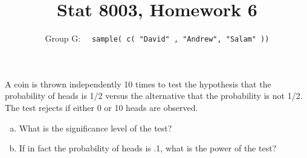 \documentclass[12pt]{article}
\newenvironment{question}[2][Question]{\begin{trivlist}
\item[\hskip \labelsep {\bfseries #1}\hskip \labelsep {\bfseries #2.}]}{\end{trivlist}}
\begin{document}
 \renewcommand{\arraystretch}{1.3}

 
\title{Stat 8003, Homework 6}%
\author{Group G: \ \ \texttt{sample( c( "David" , "Andrew",  "Salam" ))}
\\ %
} %
 
\maketitle
 
 \begin{question}{6.1}  A coin is thrown independently 10 times to test the hypothesis that the probability of heads is
1/2 versus the alternative that the probability is not 1/2. The test rejects if either 0 or 10 heads
are observed.

\begin{enumerate}[(a)]
\item What is the significance level of the test?
\item If in fact the probability of heads is .1, what is the power of the test?
\end{enumerate}

\end{question} 
\end{document}
